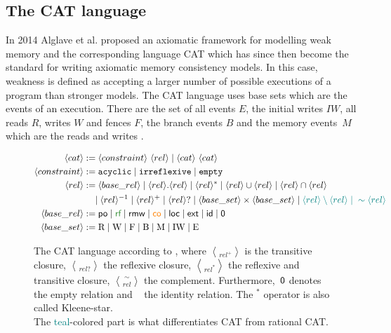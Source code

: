 \documentclass[a4paper,twoside,12pt, english]{article}
\begin{document}
\subsection{The CAT language} \label{sec:cat}

In 2014 Alglave et al. proposed an axiomatic framework for modelling weak memory and the corresponding language CAT \cite{Alg+14} which has since then become the standard for writing axiomatic memory consistency models. In this case, weakness is defined as accepting a larger number of possible executions of a program than stronger models. 
The CAT language uses base sets which are the events of an execution. There are the set of all events $E$, the initial writes $IW$, all reads $R$, writes $W$ and fences $F$, the branch events $B$ and the memory events~$M$ which are the reads and writes \cite{Alg+16}.

\begin{figure}[b]
\vspace*{-0.5cm}
\begin{align*}
\langle cat\rangle &:= \bangle{constraint}~ \bangle{rel} \mid \langle cat \rangle~ \langle cat\rangle \\
\bangle{constraint} &:= \texttt{acyclic} \mid \texttt{irreflexive} \mid \texttt{empty} \\
\bangle{rel} &:= \bangle{base\_rel} \mid \langle rel \rangle . \bangle{rel} \mid \bangle{rel}^* \mid \bangle{rel} \cup \bangle{rel} \mid \bangle{rel} \cap \bangle{rel} \\ &\quad \mid \bangle{rel}^{-1} \mid \bangle{rel}^+ \mid \bangle{rel}? \mid \bangle{base\_set} \times \bangle{base\_set} \mid \textcolor{teal}{\bangle{rel}\setminus \bangle{rel} \mid{} \sim\bangle{rel}} \\
\bangle{base\_rel} &:= \textsf{po} \mid \text{\rf} \mid \textsf{rmw} \mid \co \mid \loc \mid \ext \mid \textsf{id} \mid \textsf{0} \\
\bangle{base\_set} &:= \text{R} \mid \text{W} \mid \text{F} \mid \text{B} \mid \text{M} \mid \text{IW} \mid \text{E}
\end{align*}
\caption{The CAT language according to \cite{Alg+16}, where $\bangle{rel}^+$ is the transitive closure, $\bangle{rel}?$ the reflexive closure, $\bangle{rel}^*$ the reflexive and transitive closure, $\sim\bangle{rel}$ the complement. Furthermore,~$\textsf{\upshape 0}$ denotes the empty relation and \id~ the identity relation. The $^*$ operator is also called Kleene-star. \\
The \textcolor{teal}{teal}-colored part is what differentiates CAT from rational CAT.}   
\label{fig:cat}
\end{figure}
\end{document}
